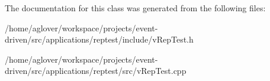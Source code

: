 The documentation for this class was generated from the following files\+:\begin{DoxyCompactItemize}
\item 
/home/aglover/workspace/projects/event-\/driven/src/applications/reptest/include/v\+Rep\+Test.\+h\item 
/home/aglover/workspace/projects/event-\/driven/src/applications/reptest/src/v\+Rep\+Test.\+cpp\end{DoxyCompactItemize}
